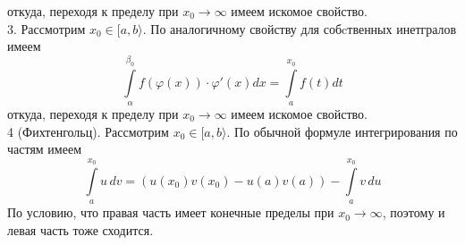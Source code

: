 откуда, переходя к пределу при $x_0\to\infty$ имеем искомое свойство.\\
3. Рассмотрим $x_0\in [a,b\rangle$. По аналогичному свойству для
собcтвенных инетгралов имеем
$$\int\limits_{\alpha}^{\beta_0}f(\varphi(x))\cdot \varphi'(x)dx=
    \int\limits_{a}^{x_0} f(t)dt$$ 
откуда, переходя к пределу при $x_0\to\infty$ имеем искомое свойство.\\
4 (Фихтенгольц). Рассмотрим $x_0\in [a,b\rangle$. По обычной формуле 
интегрирования по частям имеем
$$\int\limits_{a}^{x_0} u\,dv = (u(x_0)v(x_0)-u(a)v(a))-\int\limits_{a}^{x_0}
v\,du$$ 
По условию, что правая часть имеет конечные пределы при $x_0\to \infty$, 
поэтому и левая часть тоже сходится. 










